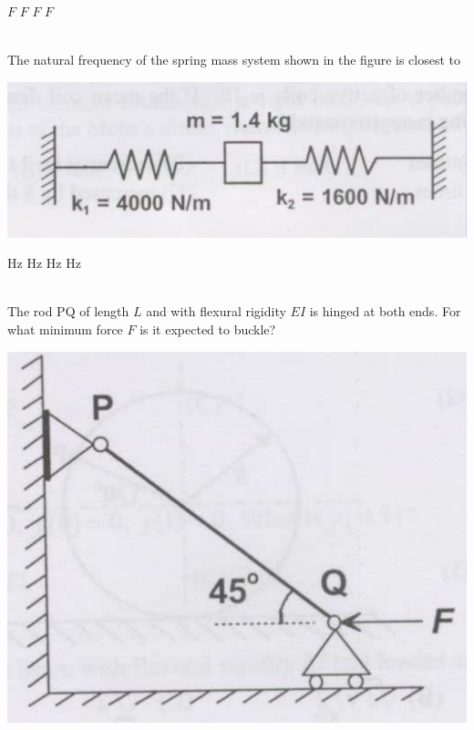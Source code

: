 \documentclass[addpoints,11pt]{exam}
\begin{document}
\begin{questions}
        \begin{oneparchoices}
             $F$
             $F$
             $F$
             $F$
        \end{oneparchoices}\\

        \question The natural frequency of the spring mass system shown in the figure is closest to
        
        \begin{center}
            \includegraphics[scale=0.3]{q35}
        \end{center}

        \begin{oneparchoices}
             Hz
             Hz
             Hz
             Hz
        \end{oneparchoices}\\

        \question The rod PQ of length $L$ and with flexural rigidity $EI$ is hinged at both ends. For what minimum force $F$ is it expected to buckle?\\

        \begin{center}
            \includegraphics[scale=0.3]{q36}
        \end{center}
        

\end{questions}
\end{document}
